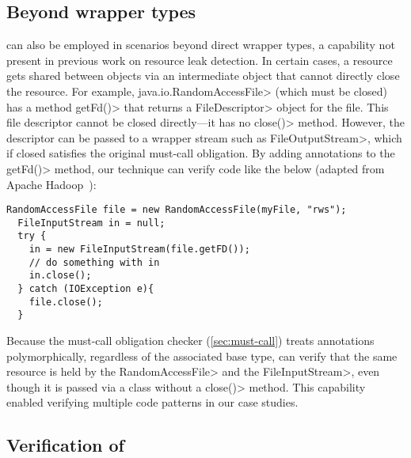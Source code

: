 
\subsection{Beyond wrapper types}

\MustCallAlias can also be employed in scenarios beyond direct wrapper types, a
capability not present in previous work on resource leak detection.  In certain cases, a resource gets
shared between objects via an intermediate object that cannot directly close the
resource.  For example, \<java.io.RandomAccessFile> (which must be closed) has
a method \<getFd()> that returns a \<FileDescriptor>
object for the file. This file
descriptor cannot be closed directly---it has no \<close()> method.
However, the descriptor can be passed to a wrapper stream such as
\<FileOutputStream>, which if closed satisfies the original must-call
obligation.  By adding \MustCallAlias annotations to the \<getFd()> method, our
technique can verify code like the below (adapted from Apache Hadoop~\cite{hadoop-random-access-file}):
\begin{lstlisting}[frame=tb,belowskip=3mm]
  RandomAccessFile file = new RandomAccessFile(myFile, "rws");
  FileInputStream in = null;
  try {
    in = new FileInputStream(file.getFD());
    // do something with in  
    in.close();
  } catch (IOException e){
    file.close();
  }
\end{lstlisting}
Because the must-call obligation checker (\cref{sec:must-call})
treats \MustCallAlias annotations
polymorphically, regardless of the associated base type,
\Tool can verify that the same resource is held by
the \<Random\-Access\-File> and the \<File\-Input\-Stream>, even though it
is passed via a class without a \<close()> method.
This capability enabled
verifying multiple code patterns in our case studies.

\subsection{Verification of \MustCallAlias}\label{sec:MustCallAlias-verification}

